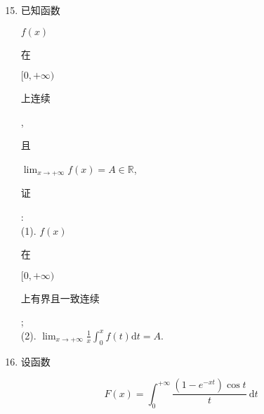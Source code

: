 \documentclass[10pt]{article}
\begin{document}
\begin{enumerate}
  \setcounter{enumi}{14}
  \item \begin{CJK}{UTF8}{mj}已知函数\end{CJK} $f(x)$ \begin{CJK}{UTF8}{mj}在\end{CJK} $[0,+\infty)$ \begin{CJK}{UTF8}{mj}上连续\end{CJK}, \begin{CJK}{UTF8}{mj}且\end{CJK} $\lim _{x \rightarrow+\infty} f(x)=A \in \mathbb{R}$, \begin{CJK}{UTF8}{mj}证\end{CJK}:\\
(1). $f(x)$ \begin{CJK}{UTF8}{mj}在\end{CJK} $[0,+\infty)$ \begin{CJK}{UTF8}{mj}上有界且一致连续\end{CJK};\\
(2). $\lim _{x \rightarrow+\infty} \frac{1}{x} \int_{0}^{x} f(t) \mathrm{d} t=A$.

  \item \begin{CJK}{UTF8}{mj}设函数\end{CJK}

\end{enumerate}
$$
F(x)=\int_{0}^{+\infty} \frac{\left(1-e^{-x t}\right) \cos t}{t} \mathrm{~d} t
$$
\end{document}
